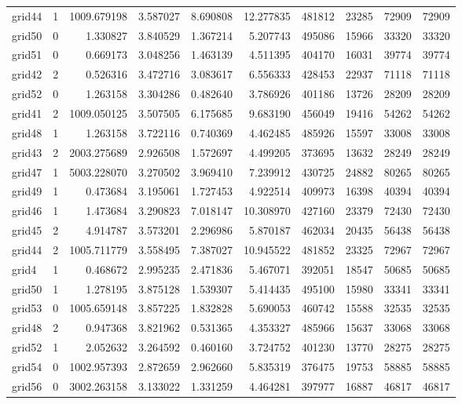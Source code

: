 \documentclass[../../../thesis.tex]{subfiles}
\begin{document}
\begin{longtable}{|l|r|r|r|r|r|r|r|r|r|}
grid44 & 1 & 1009.679198 & 3.587027 & 8.690808 & 12.277835 & 481812 & 23285 & 72909 & 72909 \\
grid50 & 0 & 1.330827 & 3.840529 & 1.367214 & 5.207743 & 495086 & 15966 & 33320 & 33320 \\
grid51 & 0 & 0.669173 & 3.048256 & 1.463139 & 4.511395 & 404170 & 16031 & 39774 & 39774 \\
grid42 & 2 & 0.526316 & 3.472716 & 3.083617 & 6.556333 & 428453 & 22937 & 71118 & 71118 \\
grid52 & 0 & 1.263158 & 3.304286 & 0.482640 & 3.786926 & 401186 & 13726 & 28209 & 28209 \\
grid41 & 2 & 1009.050125 & 3.507505 & 6.175685 & 9.683190 & 456049 & 19416 & 54262 & 54262 \\
grid48 & 1 & 1.263158 & 3.722116 & 0.740369 & 4.462485 & 485926 & 15597 & 33008 & 33008 \\
grid43 & 2 & 2003.275689 & 2.926508 & 1.572697 & 4.499205 & 373695 & 13632 & 28249 & 28249 \\
grid47 & 1 & 5003.228070 & 3.270502 & 3.969410 & 7.239912 & 430725 & 24882 & 80265 & 80265 \\
grid49 & 1 & 0.473684 & 3.195061 & 1.727453 & 4.922514 & 409973 & 16398 & 40394 & 40394 \\
grid46 & 1 & 1.473684 & 3.290823 & 7.018147 & 10.308970 & 427160 & 23379 & 72430 & 72430 \\
grid45 & 2 & 4.914787 & 3.573201 & 2.296986 & 5.870187 & 462034 & 20435 & 56438 & 56438 \\
grid44 & 2 & 1005.711779 & 3.558495 & 7.387027 & 10.945522 & 481852 & 23325 & 72967 & 72967 \\
grid4 & 1 & 0.468672 & 2.995235 & 2.471836 & 5.467071 & 392051 & 18547 & 50685 & 50685 \\
grid50 & 1 & 1.278195 & 3.875128 & 1.539307 & 5.414435 & 495100 & 15980 & 33341 & 33341 \\
grid53 & 0 & 1005.659148 & 3.857225 & 1.832828 & 5.690053 & 460742 & 15588 & 32535 & 32535 \\
grid48 & 2 & 0.947368 & 3.821962 & 0.531365 & 4.353327 & 485966 & 15637 & 33068 & 33068 \\
grid52 & 1 & 2.052632 & 3.264592 & 0.460160 & 3.724752 & 401230 & 13770 & 28275 & 28275 \\
grid54 & 0 & 1002.957393 & 2.872659 & 2.962660 & 5.835319 & 376475 & 19753 & 58885 & 58885 \\
grid56 & 0 & 3002.263158 & 3.133022 & 1.331259 & 4.464281 & 397977 & 16887 & 46817 & 46817 \\

\end{longtable}
\end{document}
